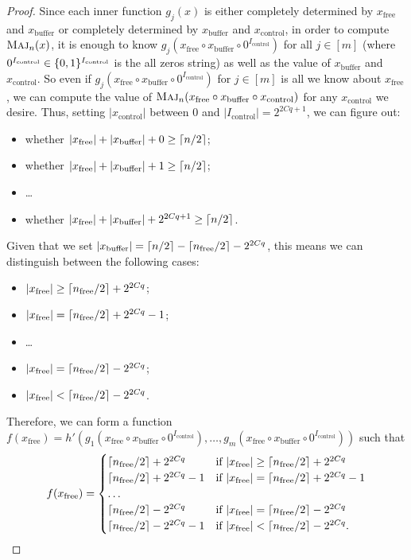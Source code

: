 \documentclass[10pt,a4paper]{article}
\theoremstyle{definition}
\theoremstyle{remark}
\newcommand{\mathsc}[1]{{\normalfont\textsc{#1}}}
\DeclarePairedDelimiter{\ceil}{\lceil}{\rceil}
\DeclarePairedDelimiter{\set}{\{}{\}}
\DeclareMathOperator{\Maj}{\mathsc{Maj}}
\newcommand{\zo}{\set{0,1}}
\newcommand{\Icontrol}{I_{\mathrm{control}}}
\newcommand{\xfree}{x_{\mathrm{free}}}
\newcommand{\xcontrol}{x_{\mathrm{control}}}
\newcommand{\xbuffer}{x_{\mathrm{buffer}}}
\newcommand{\nfree}{n_{\mathrm{free}}}
\begin{document}
\begin{proof}
Since each inner function $g_j(x)$ is either completely determined by $\xfree$ and $\xbuffer$ or completely determined by $\xbuffer$ and $\xcontrol$, in order to compute $\Maj_n(x)$, it is enough to know $g_j(\xfree \circ \xbuffer \circ 0^{\Icontrol})$ for all $j \in [m]$ (where $0^{\Icontrol} \in \zo^{\Icontrol}$ is the all zeros string) as well as the value of $\xbuffer$ and $\xcontrol$.
So even if $g_j(\xfree \circ \xbuffer \circ 0^{\Icontrol})$ for $j \in [m]$ is all we know about $\xfree$, we can compute the value of $\Maj_n(\xfree \circ \xbuffer \circ \xcontrol)$ for any $\xcontrol$ we desire.
Thus, setting $|\xcontrol|$ between $0$ and $|\Icontrol|=2^{2Cq+1}$, we can figure out:
\begin{itemize}
    \item whether $|\xfree| + |\xbuffer| + 0 \geq \ceil{n/2}$;
    \item whether $|\xfree| + |\xbuffer| + 1 \geq \ceil{n/2}$;
    \item \ldots
    \item whether $|\xfree| + |\xbuffer| + 2^{2Cq+1} \geq \ceil{n/2}$.
\end{itemize}
Given that we set $|\xbuffer| = \ceil{n/2} - \ceil{\nfree/2} - 2^{2Cq}$, this means we can distinguish between the following cases:
\begin{itemize}
    \item $|\xfree| \geq \ceil{\nfree/2} + 2^{2Cq}$;
    \item $|\xfree| = \ceil{\nfree/2}+2^{2Cq}-1$;
    \item \ldots
    \item $|\xfree| = \ceil{\nfree/2}-2^{2Cq}$;
    \item $|\xfree| < \ceil{\nfree/2}-2^{2Cq}$.
\end{itemize}
Therefore, we can form a function $f(\xfree) = h'(g_1(\xfree \circ \xbuffer \circ 0^{\Icontrol}), \ldots, g_m(\xfree \circ \xbuffer \circ 0^{\Icontrol}))$ such that
\[
f(\xfree) = 
\begin{cases}
    \ceil{\nfree/2} + 2^{2Cq} & \text{if $|\xfree| \geq \ceil{\nfree/2} + 2^{2Cq}$}\\
    \ceil{\nfree/2} + 2^{2Cq}-1 & \text{if $|\xfree| = \ceil{\nfree/2} + 2^{2Cq}-1$}\\
    \ldots &\\
    \ceil{\nfree/2}-2^{2Cq} & \text{if $|\xfree| = \ceil{\nfree/2}-2^{2Cq}$}\\
    \ceil{\nfree/2}-2^{2Cq}-1 & \text{if $|\xfree| < \ceil{\nfree/2}-2^{2Cq}$.}
\end{cases}
\]


\end{proof}
\end{document}
